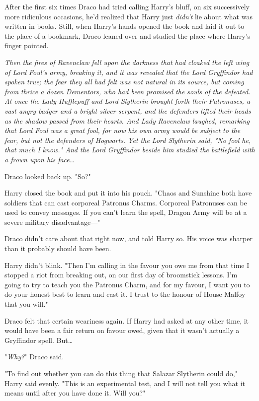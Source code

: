 After the first six times Draco had tried calling Harry’s bluff, on six
successively more ridiculous occasions, he’d realized that Harry just
\emph{didn’t} lie about what was written in books. Still, when Harry’s hands
opened the book and laid it out to the place of a bookmark, Draco leaned over
and studied the place where Harry’s finger pointed.

\emph{Then the fires of Ravenclaw fell upon the darkness that had cloaked the
left wing of Lord Foul’s army, breaking it, and it was revealed that the Lord
Gryffindor had spoken true; the fear they all had felt was not natural in its
source, but coming from thrice a dozen Dementors, who had been promised the
souls of the defeated. At once the Lady Hufflepuff and Lord Slytherin brought
forth their Patronuses, a vast angry badger and a bright silver serpent, and
the defenders lifted their heads as the shadow passed from their hearts. And
Lady Ravenclaw laughed, remarking that Lord Foul was a great fool, for now his
own army would be subject to the fear, but not the defenders of Hogwarts. Yet
the Lord Slytherin said, "No fool he, that much I know." And the Lord
Gryffindor beside him studied the battlefield with a frown upon his
face…}

Draco looked back up. "So?"

Harry closed the book and put it into his pouch. "Chaos and Sunshine both have
soldiers that can cast corporeal Patronus Charms. Corporeal Patronuses can be
used to convey messages. If you can’t learn the spell, Dragon Army will be at a
severe military disadvantage—"

Draco didn’t care about that right now, and told Harry so. His voice was
sharper than it probably should have been.

Harry didn’t blink. "Then I’m calling in the favour you owe me from that time I
stopped a riot from breaking out, on our first day of broomstick lessons. I’m
going to try to teach you the Patronus Charm, and for my favour, I want you to
do your honest best to learn and cast it. I trust to the honour of House Malfoy
that you will."

Draco felt that certain weariness again. If Harry had asked at any other time,
it would have been a fair return on favour owed, given that it wasn’t actually a
Gryffindor spell. But…

"\emph{Why?}" Draco said.

"To find out whether you can do this thing that Salazar Slytherin could do,"
Harry said evenly. "This is an experimental test, and I will not tell you what
it means until after you have done it. Will you?"


